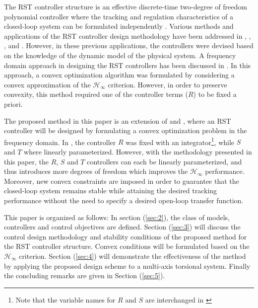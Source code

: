 \documentclass[a4paper, 10pt, conference]{ieeeconf}
\begin{document}
The RST controller structure is an effective discrete-time two-degree of freedom polynomial controller where the tracking and regulation characteristics of a closed-loop system can be formulated independently \cite{LZ06}. %
Various methods and applications of the RST controller design methodology have been addressed in \cite{BTA14}, \cite{LHM10}, \cite{KH11}, and \cite{MBH13}. However, in these previous applications, the controllers were devised based on the knowledge of the dynamic model of the physical system. A frequency domain approach in designing the RST controllers has been discussed in \cite{GKL11}. In this approach, a convex optimization algorithm was formulated by considering a convex approximation of the $\mathcal{H}_{\infty}$ criterion. However, in order to preserve convexity, this method required one of the controller terms ($R$) to be fixed a priori. 


The proposed method in this paper is an extension of \cite{GKL11} and \cite{KZ04}, where an RST controller will be designed by formulating a convex optimization problem in the frequency domain. In \cite{GKL11}, the controller $R$ was fixed with an integrator\footnote{Note that the variable names for $R$ and $S$ are interchanged in \cite{GKL11}}, while $S$ and $T$ where linearly parameterized. However, with the methodology presented in this paper, the $R$, $S$ and $T$ controllers can each be linearly parameterized, and thus introduces more degrees of freedom which improves the $\mathcal{H}_{\infty}$ performance. Moreover, new convex constraints are imposed in order to guarantee that the closed-loop system remains stable while attaining the desired tracking performance without the need to specify a desired open-loop transfer function.
 
This paper is organized as follows: In section (\ref{sec:2}), the class of models, controllers and control objectives are defined. Section (\ref{sec:3}) will discuss the control design methodology and stability conditions of the proposed method for the RST controller structure. Convex conditions will be formulated based on the $\mathcal{H}_{\infty}$ criterion. Section (\ref{sec:4}) will demonstrate the effectiveness of the method by applying the proposed design scheme to a multi-axis torsional system. Finally the concluding remarks are given in Section (\ref{sec:5}).
\end{document}
